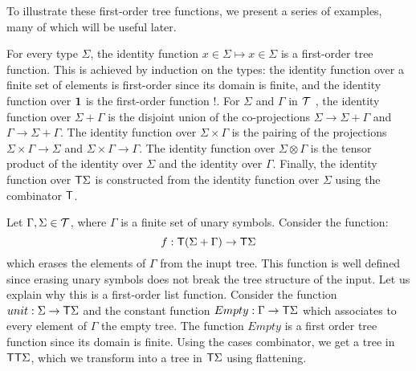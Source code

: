To illustrate these first-order tree functions, we present a series of examples, many of which will be useful later.

\bigskip
\noindent \begin{example}[Identity] For every type $\Sigma$, the identity function $x\in\Sigma\mapsto x\in\Sigma$ is a first-order tree function. This is achieved by induction on the types: the identity function over a finite set of elements is first-order since its domain is finite, and the identity function over $\mathbf{1}$ is the first-order function $!$. For $\Sigma$ and $\Gamma$ in ${\mathcal T}$ , the identity
function over $\Sigma+\Gamma$ is the disjoint union of the co-projections $\Sigma \to \Sigma + \Gamma$ and $\Gamma \to \Sigma + \Gamma$. The
identity function over $\Sigma \times \Gamma$ is the pairing of the projections $\Sigma \times \Gamma \to \Sigma$ and $\Sigma \times \Gamma \to \Gamma$. The
identity function over $\Sigma \otimes \Gamma$ is the tensor product of the identity over $\Sigma$ and the identity over $\Gamma$. Finally,
the identity function over $\mathsf T\Sigma$ is constructed from the identity function over $\Sigma$ using the combinator $\mathsf T$.
\end{example}


\bigskip
\noindent\begin{example}[Filter] Let $\Gamma, \Sigma\in{\mathcal T}$, where $\Gamma$ is a finite set of unary symbols. Consider the function:
$$ f:\mathsf T (\Sigma+\Gamma)\to\mathsf T \Sigma$$
which erases the elements of $\Gamma$ from the inupt tree. This function is well defined since erasing unary symbols does not break the tree structure of the input. 
Let us explain why this is a first-order list function. 
Consider the function $unit:\Sigma\to\mathsf T\Sigma$ and the constant function $Empty:\Gamma\to\mathsf T\Sigma$ which associates to every element of $\Gamma$ the empty tree. The function $Empty$ is a first order tree function since its domain is finite. Using the cases combinator, we get a tree in $\mathsf T\mathsf T\Sigma$, which we transform into a tree in $\mathsf T \Sigma$ using flattening.
\end{example}

